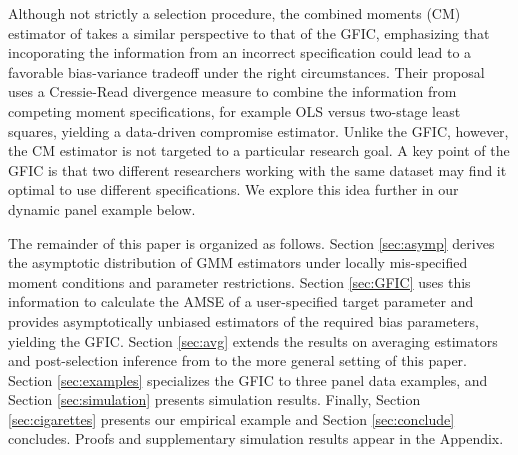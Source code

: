 Although not strictly a selection procedure, the combined moments (CM) estimator of \cite{JudgeMittelhammer} takes a similar perspective to that of the GFIC, emphasizing that incoporating the information from an incorrect specification could lead to a favorable bias-variance tradeoff under the right circumstances. 
Their proposal uses a Cressie-Read divergence measure to combine the information from competing moment specifications, for example OLS versus two-stage least squares, yielding a data-driven compromise estimator. 
Unlike the GFIC, however, the CM estimator is not targeted to a particular research goal.
A key point of the GFIC is that two different researchers working with the same dataset may find it optimal to use different specifications.
We explore this idea further in our dynamic panel example below.

The remainder of this paper is organized as follows. Section \ref{sec:asymp} derives the asymptotic distribution of GMM estimators under locally mis-specified moment conditions and parameter restrictions. 
Section \ref{sec:GFIC} uses this information to calculate the AMSE of a user-specified target parameter and provides asymptotically unbiased estimators of the required bias parameters, yielding the GFIC. 
Section \ref{sec:avg} extends the results on averaging estimators and post-selection inference from \cite{DiTraglia2016} to the more general setting of this paper.
Section \ref{sec:examples} specializes the GFIC to three panel data examples, and Section \ref{sec:simulation} presents simulation results.
Finally, Section \ref{sec:cigarettes} presents our empirical example and  Section \ref{sec:conclude} concludes.  
Proofs and supplementary simulation results appear in the Appendix.

